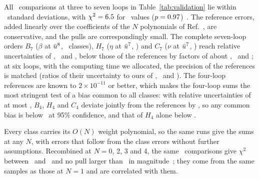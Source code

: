 All \valncmp\ comparisons at three to seven loops in Table~\ref{tab:validation} lie within \valzmax\ standard
deviations, with $\chi^2=6.5$ for \valncmp\ values ($p=0.97$)~. The reference errors, added
linearly over the coefficients of the $N$ polynomials of Ref.~\cite{Phi4tools2024}, are conservative, and the pulls are
correspondingly small. The complete seven-loop orders
$B_7$ ($\beta$ at $\bar u^{8}$, \nclBseven\ classes), $H_7$ ($\eta$ at $\bar u^{7}$, \nclHseven) and $C_7$ ($\nu$ at
$\bar u^{7}$, \nclCseven) reach relative uncertainties of \relBseven, \relHseven\ and \relCseven, below those of the
references by factors of about \precBseven, \precHseven\ and \precCseven; at six loops, with the computing time we
allocated, the precision of the references is matched (ratios of their uncertainty to ours of \precBsix,
\precHsix\ and \precCsix). The four-loop references are known to $2\times10^{-11}$ or better, which makes the
four-loop sums the most stringent test of a bias common to all classes: with relative uncertainties of at most
\fourrelmax, $B_4$, $H_4$ and $C_4$ deviate jointly from the references by \fourjointdev, so any common bias is below
\fourbiasbound\ at 95\% confidence, and that of $H_4$ alone below \hfourbiasbound.

Every class carries its $O(N)$ weight polynomial, so the same runs give the sums at any $N$, with errors that follow
from the class errors without further assumptions. Recombined at $N=0$, 2, 3 and 4, the same \valncmp\ comparisons
give $\chi^2$ between \valNchisqmin\ and \valNchisqmax\ and no pull larger than \valNzmax\ in
magnitude~; they come from the same samples as those at $N=1$ and are correlated with them.

